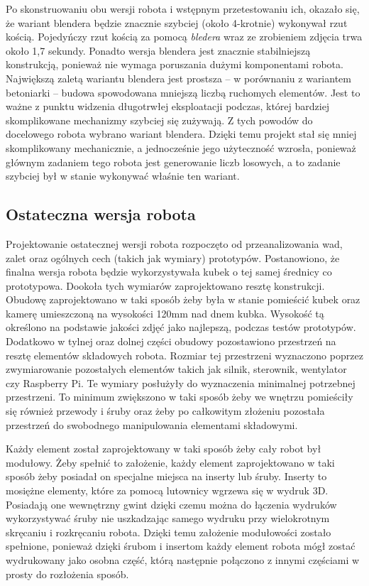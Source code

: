 Po skonstruowaniu obu wersji robota i wstępnym przetestowaniu ich, okazało się, że wariant blendera będzie znacznie szybciej (około 4-krotnie) wykonywał rzut kością.
Pojedyńczy rzut kością za pomocą \textit{bledera} wraz ze zrobieniem zdjęcia trwa około 1,7 sekundy.
Ponadto wersja blendera jest znacznie stabilniejszą konstrukcją, ponieważ nie wymaga poruszania dużymi komponentami robota. 
Największą zaletą wariantu blendera jest prostsza -- w porównaniu z wariantem betoniarki -- budowa spowodowana mniejszą liczbą ruchomych elementów. Jest to ważne z punktu widzenia
długotrwłej eksploatacji podczas, której bardziej skomplikowane mechanizmy szybciej się zużywają. Z tych powodów do docelowego robota wybrano 
wariant blendera. Dzięki temu projekt stał się mniej skomplikowany mechanicznie, a jednocześnie jego użyteczność wzrosła, ponieważ
głównym zadaniem tego robota jest generowanie liczb losowych, a to zadanie szybciej był w stanie wykonywać właśnie ten wariant.


\subsection{Ostateczna wersja robota}
Projektowanie ostatecznej wersji robota rozpoczęto od przeanalizowania wad, zalet oraz ogólnych cech (takich jak wymiary) prototypów.
Postanowiono, że finalna wersja robota będzie wykorzystywała kubek o tej samej średnicy co prototypowa. Dookoła tych wymiarów zaprojektowano 
resztę konstrukcji. Obudowę zaprojektowano w taki sposób żeby była w stanie pomieścić
kubek oraz kamerę umieszczoną na wysokości 120mm nad dnem kubka. Wysokość tą określono na podstawie jakości zdjęć jako najlepszą, podczas testów prototypów.
Dodatkowo w tylnej oraz dolnej części obudowy pozostawiono przestrzeń na resztę
elementów składowych robota. Rozmiar tej przestrzeni wyznaczono poprzez zwymiarowanie pozostałych elementów takich jak silnik, sterownik, wentylator 
czy Raspberry Pi. Te wymiary posłużyły do wyznaczenia minimalnej potrzebnej przestrzeni. To minimum zwiększono w taki sposób
żeby we wnętrzu pomieściły się również przewody i śruby oraz żeby po całkowitym złożeniu pozostała przestrzeń do swobodnego manipulowania
elementami składowymi.

Każdy element został zaprojektowany w taki sposób żeby cały robot był modułowy. Żeby spełnić to założenie, każdy element
zaprojektowano w taki sposób żeby posiadał on specjalne miejsca na inserty lub śruby. Inserty to mosiężne elementy, które za pomocą lutownicy wgrzewa się
w wydruk 3D. Posiadają one wewnętrzny gwint dzięki czemu można do łączenia wydruków wykorzystywać śruby nie uszkadzając samego wydruku przy 
wielokrotnym skręcaniu i rozkręcaniu robota. Dzięki temu założenie modułowości zostało spełnione, ponieważ dzięki śrubom i insertom każdy element robota 
mógł zostać wydrukowany jako osobna część, którą następnie połączono z innymi częściami w prosty do rozłożenia sposób.

